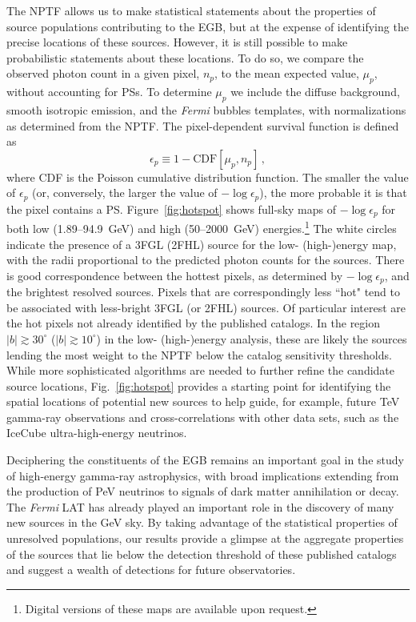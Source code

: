 The NPTF allows us to make statistical statements about the properties of source populations contributing to the EGB, but at the expense of identifying the precise locations of these sources.  However, it is still possible to make probabilistic statements about these locations.  To do so, we compare the observed photon count in a given pixel, $n_p$, to the mean expected value, $\mu_p$, without accounting for PSs.  To determine $\mu_p$ we include the diffuse background, smooth isotropic emission, and the {\it Fermi} bubbles templates, with normalizations as determined from the NPTF.
The pixel-dependent survival function is defined as
\begin{equation}
\epsilon_p \equiv 1- \text{CDF}\left[ \mu_p, n_p \right] \, ,
\end{equation}
where CDF is the Poisson cumulative distribution function.  The smaller the value of $\epsilon_p$ (or, conversely, the larger the value of $-\log \epsilon_p$), the more probable it is that the pixel contains a PS.  Figure~\ref{fig:hotspot} shows full-sky maps of $-\log \epsilon_p$ for both low (1.89--94.9~GeV) and high (50--2000~GeV) energies.\footnote{ Digital versions of these maps are available upon request.}  The white circles indicate the presence of a 3FGL (2FHL) source for the low- \mbox{(high-)}energy map, with the radii proportional to the predicted photon counts for the sources.  There is good correspondence between the hottest pixels, as determined by $-\log \epsilon_p$,  and the brightest resolved sources.  Pixels that are correspondingly less ``hot" tend to be associated with less-bright 3FGL (or 2FHL) sources.  Of particular interest are the hot pixels not already identified by the published catalogs.  In the region $|b| \gtrsim 30^\circ$ ($|b| \gtrsim 10^\circ$) in the low- (high-)energy analysis, these are likely the sources lending the most weight to the NPTF below the catalog sensitivity thresholds.  While more sophisticated algorithms are needed to further refine the candidate source locations, Fig.~\ref{fig:hotspot} provides a starting point for identifying the spatial locations of potential new sources to help guide, for example, future TeV gamma-ray observations and cross-correlations with other data sets, such as the IceCube ultra-high-energy neutrinos.

Deciphering the constituents of the EGB remains an important goal in the study of high-energy gamma-ray astrophysics, with broad implications extending from the production of PeV neutrinos to signals of dark matter annihilation or decay. The \emph{Fermi} LAT has already played an important role in the discovery of many new sources in the GeV sky.  By taking advantage of the statistical properties of unresolved populations, our results provide a glimpse at the aggregate properties of the sources that lie below the detection threshold of these published catalogs and suggest a wealth of detections for future observatories.

